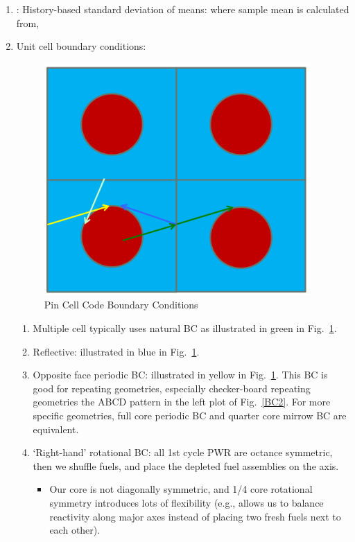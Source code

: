 \documentclass{school-22.211-notes}
\begin{document}
\begin{enumerate}
\item {}:
  History-based standard deviation of means:
  where sample mean is calculated from, 
\item Unit cell boundary conditions: 
  \begin{figure}[h]
    \centering
    \includegraphics[width=4in]{images/pin/BC1.png}
    \caption{Pin Cell Code Boundary Conditions} \label{BC1}
  \end{figure}
  \begin{enumerate}
    \item Multiple cell typically uses natural BC as illustrated in green in Fig.~\ref{BC1}. 
    \item Reflective: illustrated in blue in Fig.~\ref{BC1}.  
    \item Opposite face periodic BC: illustrated in yellow in Fig.~\ref{BC1}. 
This BC is good for repeating geometries, especially checker-board repeating geometries the ABCD pattern in the left plot of Fig.~\ref{BC2}. For more specific geometries, full core periodic BC and quarter core mirrow BC are equivalent. 
    \item `Right-hand' rotational BC: all 1st cycle PWR are octance symmetric, then we shuffle fuels, and place the depleted fuel assemblies on the axis. 
      \begin{itemize}
      \item Our core is not diagonally symmetric, and 1/4 core rotational symmetry introduces lots of flexibility (e.g., allows us to balance reactivity along major axes instead of placing two fresh fuels next to each other). 

\end{itemize}
\end{enumerate}
\end{enumerate}
\end{document}
